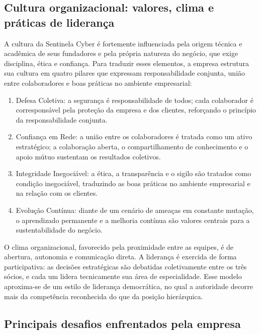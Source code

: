 \documentclass[12pt,a4paper]{article}
\begin{document}
\subsection{Cultura organizacional: valores, clima e práticas de liderança}

A cultura da Sentinela Cyber é fortemente influenciada pela origem técnica e
acadêmica de seus fundadores e pela própria natureza do negócio, que exige
disciplina, ética e confiança. Para traduzir esses elementos, a empresa
estrutura sua cultura em quatro pilares que expressam responsabilidade
conjunta, união entre colaboradores e boas práticas no ambiente empresarial:

\begin{enumerate}[label=\arabic*.]
  \item Defesa Coletiva: a segurança é responsabilidade de todos; cada
        colaborador é corresponsável pela proteção da empresa e dos clientes,
        reforçando o princípio da responsabilidade conjunta.
  \item Confiança em Rede: a união entre os colaboradores é tratada como um
        ativo estratégico; a colaboração aberta, o compartilhamento de
        conhecimento e o apoio mútuo sustentam os resultados coletivos.
  \item Integridade Inegociável: a ética, a transparência e o sigilo são
        tratados como condição inegociável, traduzindo as boas práticas no
        ambiente empresarial e na relação com os clientes.
  \item Evolução Contínua: diante de um cenário de ameaças em constante mutação,
        o aprendizado permanente e a melhoria contínua são valores centrais para
        a sustentabilidade do negócio.
\end{enumerate}

O clima organizacional, favorecido pela proximidade entre as equipes, é de
abertura, autonomia e comunicação direta. A liderança é exercida de forma
participativa: as decisões estratégicas são debatidas coletivamente entre os
três sócios, e cada um lidera tecnicamente sua área de especialidade. Esse
modelo aproxima-se de um estilo de liderança democrática, no qual a autoridade
decorre mais da competência reconhecida do que da posição hierárquica.

\subsection{Principais desafios enfrentados pela empresa}
\end{document}

